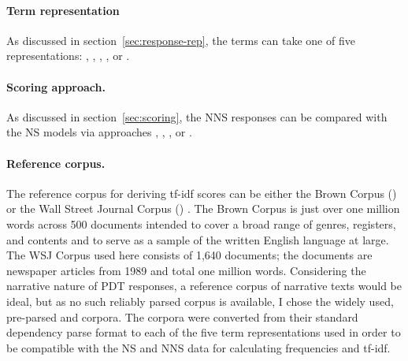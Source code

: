 \paragraph{Term representation} As discussed in
section~\ref{sec:response-rep}, the terms can take one of five
representations: , , , ,
or .

\paragraph{Scoring approach.} As discussed in
section~\ref{sec:scoring}, the NNS responses can be
compared with the NS models via approaches , , , or .

\paragraph{Reference corpus.} The reference corpus for deriving tf-idf
scores can be either the Brown Corpus () \citep{kucera:francis:67} or the Wall Street Journal Corpus () \citep{marcus-et-al:93}. The Brown Corpus is just over one million words across 500 documents intended to cover a broad range of genres, registers, and contents and to serve as a sample of the written English language at large.
The WSJ Corpus used here consists of 1,640 documents; the documents are newspaper articles from 1989 and total one million words. Considering the narrative nature of PDT responses, a reference corpus of narrative texts would be ideal, but as no such reliably parsed corpus is available, I chose the widely used, pre-parsed  and  corpora. The corpora were converted from their standard dependency parse format to each of the five term representations used in order to be compatible with the NS and NNS data for calculating frequencies and tf-idf.

%
